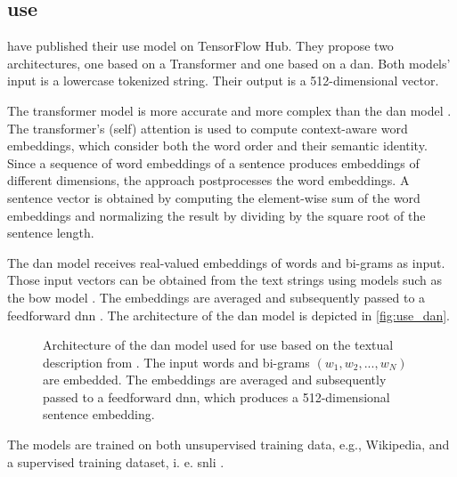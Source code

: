 \subsection{\acl*{use}}\label{subsec:univ-sent-encoder}

\citeauthor{UniversalSentEnc2018} have published their \ac{use} model on TensorFlow Hub.
They propose two architectures, one based on a Transformer and one based on a \ac{dan}.
Both models' input is a lowercase tokenized string.
Their output is a 512-dimensional vector.

The transformer model is more accurate and more complex than the \ac{dan} model \cite{UniversalSentEnc2018}.
The transformer's (self) attention is used to compute context-aware word embeddings, which consider both the word order and their semantic identity.
Since a sequence of word embeddings of a sentence produces embeddings of different dimensions, the approach postprocesses the word embeddings.
A sentence vector is obtained by computing the element-wise sum of the word embeddings 
and normalizing the result by dividing by the square root of the sentence length.

The \ac{dan} model receives real-valued embeddings of words and bi-grams as input.
Those input vectors can be obtained from the text strings using models such as the \ac{bow} model \cite{UniversalSentEnc-dan-input-emb}.
The embeddings are averaged and subsequently passed to a feedforward \ac{dnn} \cite{UniversalSentEnc2018}.
The architecture of the \ac{dan} model is depicted in \autoref{fig:use_dan}.

\begin{figure}[!htb] %
    \centering
    
    \caption[Architecture of \ac{use}]{Architecture of the \ac{dan} model used for \ac{use} based on the textual description from \cite{inferSent2018}.
    The input words and bi-grams $(w_1, w_2, ..., w_N)$ are embedded.
    The embeddings are averaged and subsequently passed to a feedforward \ac{dnn}, which produces a 512-dimensional sentence embedding.
    }
    \label{fig:use_dan}
\end{figure}

The models are trained on both unsupervised training data, e.g., Wikipedia, and a supervised training dataset, i. e. \ac{snli} \cite{UniversalSentEnc2018, HfsentTrans2019}.

